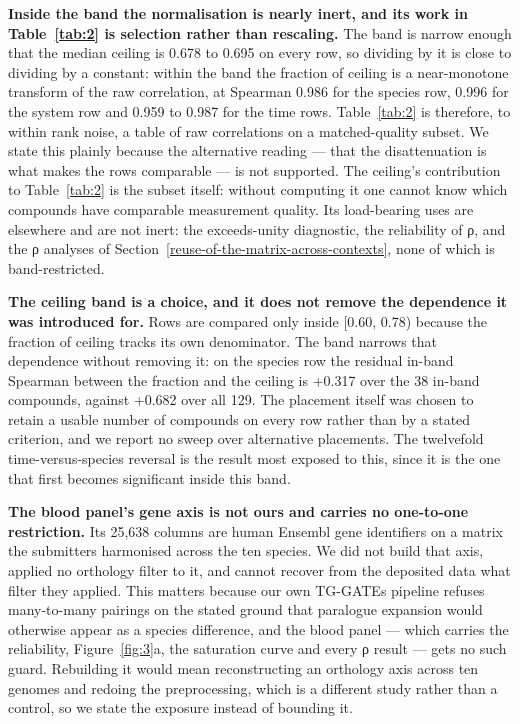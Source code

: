 \documentclass[11pt,a4paper]{article}
\begin{document}
\textbf{Inside the band the normalisation is nearly inert, and its work
in Table~\ref{tab:2} is selection rather than rescaling.} The band is narrow
enough that the median ceiling is 0.678 to 0.695 on every row, so
dividing by it is close to dividing by a constant: within the band the
fraction of ceiling is a near-monotone transform of the raw correlation,
at Spearman 0.986 for the species row, 0.996 for the system row and
0.959 to 0.987 for the time rows. Table~\ref{tab:2} is therefore, to within rank
noise, a table of raw correlations on a matched-quality subset. We state
this plainly because the alternative reading --- that the disattenuation
is what makes the rows comparable --- is not supported. The ceiling's
contribution to Table~\ref{tab:2} is the subset itself: without computing it one
cannot know which compounds have comparable measurement quality. Its
load-bearing uses are elsewhere and are not inert: the exceeds-unity
diagnostic, the reliability of ρ, and the ρ analyses of Section~\ref{reuse-of-the-matrix-across-contexts},
none of which is band-restricted.

\textbf{The ceiling band is a choice, and it does not remove the
dependence it was introduced for.} Rows are compared only inside
{[}0.60, 0.78) because the fraction of ceiling tracks its own
denominator. The band narrows that dependence without removing it: on
the species row the residual in-band Spearman between the fraction and
the ceiling is +0.317 over the 38 in-band compounds, against +0.682 over
all 129. The placement itself was chosen to retain a usable number of
compounds on every row rather than by a stated criterion, and we report
no sweep over alternative placements. The twelvefold time-versus-species
reversal is the result most exposed to this, since it is the one that
first becomes significant inside this band.

\textbf{The blood panel's gene axis is not ours and carries no
one-to-one restriction.} Its 25,638 columns are human Ensembl gene
identifiers on a matrix the submitters harmonised across the ten
species. We did not build that axis, applied no orthology filter to it,
and cannot recover from the deposited data what filter they applied.
This matters because our own TG-GATEs pipeline refuses many-to-many
pairings on the stated ground that paralogue expansion would otherwise
appear as a species difference, and the blood panel --- which carries
the reliability, Figure~\ref{fig:3}a, the saturation curve and every ρ result ---
gets no such guard. Rebuilding it would mean reconstructing an orthology
axis across ten genomes and redoing the preprocessing, which is a
different study rather than a control, so we state the exposure instead
of bounding it.
\end{document}
